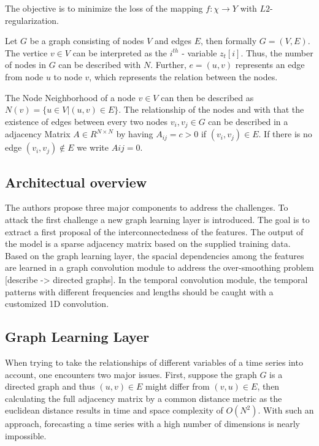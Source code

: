 \documentclass[letterpaper,twocolumn,12pt]{article}
\begin{document}
    The objective is to minimize the loss of the mapping $f: \chi \rightarrow Y$ with $L2$-regularization.

    Let $G$ be a graph consisting of nodes $V$ and edges $E$, then formally $G=(V, E)$. The vertice $v \in V$ can be
    interpreted as the $i^{th}$ - variable $z_t[i]$. Thus, the number of nodes in $G$ can be described with $N$.
    Further, $e = (u,v)$ represents an edge from node $u$ to node $v$, which represents the relation between the nodes.

    The Node Neighborhood of a node $v \in V$ can then be described as $N(v) = \{u \in V| (u,v) \in E\}$.
    The relationship of the nodes and with that the existence of edges between every two nodes $v_i,v_j \in G$
    can be described in a adjacency Matrix $A \in R^{N\times N}$ by
    having  $A_{ij} = c > 0$ if $(v_i,v_j) \in E$. If there is no edge $(v_i,v_j) \notin E$ we write $Aij = 0$.

    \subsection{Architectual overview}
    The authors propose three major components to address the challenges. To attack the first challenge a new graph learning layer
    is introduced. The goal is to extract a first proposal of the interconnectedness of the features. The output of the model is a sparse adjacency matrix based on the supplied training data.
    Based on the graph learning layer, the spacial dependencies among the features are learned in a graph convolution module to address the over-smoothing problem [describe -> directed graphs].
    In the temporal convolution module, the temporal patterns with different frequencies and lengths should be caught with a customized 1D convolution.

    \subsection{Graph Learning Layer}
    When trying to take the relationships of different variables of a time series into account, one encounters two major issues.
    First, suppose the graph $G$ is a directed graph and thus $(u,v)\in E$ might differ from $(v,u)\in E$,
    then calculating the full adjacency matrix by a common distance metric as the euclidean distance results in time and space complexity of $O(N^2)$.
    With such an approach, forecasting a time series with a high number of dimensions is nearly impossible.
\end{document}
